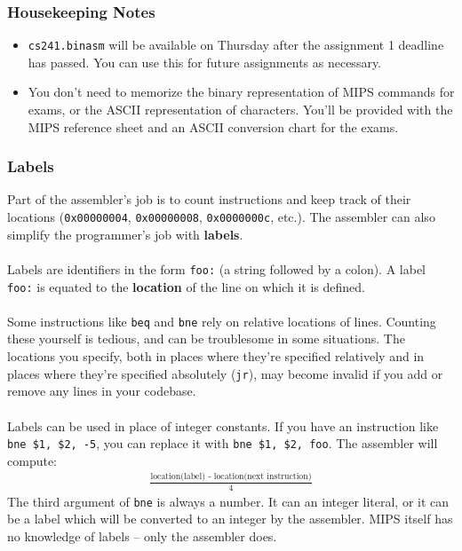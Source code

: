 \documentclass[]{article}
\theoremstyle{definition}
\newcommand{\lecture}[1]{\marginpar{{\footnotesize $\leftarrow$ \underline{#1}}}}
\begin{document}
		\subsubsection{Housekeeping Notes}
			\begin{itemize}
				\item \verb+cs241.binasm+ will be available on Thursday after the assignment 1 deadline has passed. You can use this for future assignments as necessary.
				\item You don't need to memorize the binary representation of MIPS commands for exams, or the ASCII representation of characters. You'll be provided with the MIPS reference sheet and an ASCII conversion chart for the exams.
			\end{itemize}
			\subsubsection{Labels} \lecture{January 16, 2013}
				Part of the assembler's job is to count instructions and keep track of their locations (\verb+0x00000004+, \verb+0x00000008+, \verb+0x0000000c+, etc.). The assembler can also simplify the programmer's job with \textbf{labels}.
				\\ \\
				Labels are identifiers in the form \verb+foo:+ (a string followed by a colon). A label \verb+foo:+ is equated to the \textbf{location} of the line on which it is defined.
				\\ \\
				Some instructions like \verb+beq+ and \verb+bne+ rely on relative locations of lines. Counting these yourself is tedious, and can be troublesome in some situations. The locations you specify, both in places where they're specified relatively and in places where they're specified absolutely (\verb+jr+), may become invalid if you add or remove any lines in your codebase.
				\\ \\
				Labels can be used in place of integer constants. If you have an instruction like \verb+bne $1, $2, -5+, you can replace it with \verb+bne $1, $2, foo+. The assembler will compute:
				\begin{align*}
					\frac{\text{location(label) - location(next instruction)}}{4}
				\end{align*}
				The third argument of \verb+bne+ is always a number. It can an integer literal, or it can be a label which will be converted to an integer by the assembler. MIPS itself has no knowledge of labels -- only the assembler does.
\end{document}
